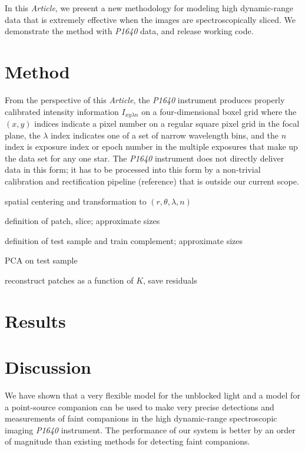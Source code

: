 \documentclass[12pt,pdftex,preprint]{aastex}
\newcommand{\project}[1]{\textsl{#1}}
\newcommand{\documentname}{\textsl{Article}}
\begin{document}
In this \documentname, we present a new methodology for modeling high
dynamic-range data that is extremely effective when the images are
spectroscopically sliced.  We demonstrate the method with \project{P1640} data,
and release working code.

\section{Method}

From the perspective of this \documentname, the \project{P1640}
instrument produces properly calibrated intensity information $I_{x y
  \lambda n}$ on a four-dimensional boxel grid where the $(x, y)$
indices indicate a pixel number on a regular square pixel grid in the
focal plane, the $\lambda$ index indicates one of a set of narrow
wavelength bins, and the $n$ index is exposure index or epoch number
in the multiple exposures that make up the data set for any one star.
The \project{P1640} instrument does not directly deliver data in this
form; it has to be processed into this form by a non-trivial
calibration and rectification pipeline (reference) that is outside our
current scope.

spatial centering and transformation to $(r, \theta, \lambda, n)$

definition of patch, slice; approximate sizes

definition of test sample and train complement; approximate sizes

PCA on test sample

reconstruct patches as a function of $K$, save residuals

\section{Results}

\section{Discussion}

We have shown that a very flexible model for the unblocked light and a
model for a point-source companion can be used to make very precise
detections and measurements of faint companions in the high
dynamic-range spectroscopic imaging \project{P1640} instrument.  The
performance of our system is better by an order of magnitude than
existing methods for detecting faint companions.
\end{document}
